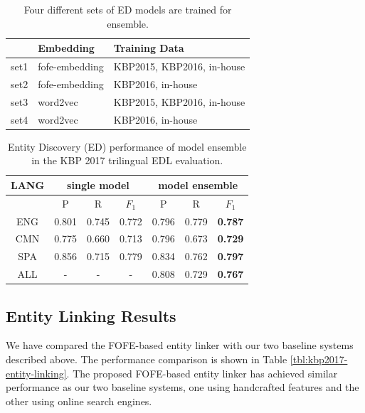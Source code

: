\documentclass[11pt]{article}
\begin{document}
\begin{table}
	\centering
	\begin{tabular}{|l|l|l|}
		\hline
		& Embedding & Training Data \\
		\hline
		set1 & fofe-embedding & KBP2015, KBP2016, in-house  \\
		set2 & fofe-embedding & KBP2016, in-house  \\
		set3 & word2vec & KBP2015, KBP2016, in-house  \\
		set4 & word2vec & KBP2016, in-house  \\
		\hline
	\end{tabular}
	\caption{Four different sets of ED models are trained for ensemble.}
	\label{tbl:model-diff}
\end{table}

\begin{table}
	\centering
	\begin{tabular}{|c|c|c|c|c|c|c|}
		\hline
		LANG  &  \multicolumn{3}{|c|}{single model} & \multicolumn{3}{|c|}{model ensemble} \\ \hline
		  &  P   &  R  &  $F_1$ &  P   &  R  &  $F_1$ \\ \hline 
		ENG &  0.801 & 0.745 & 0.772 & 0.796 & 0.779 & {\bf 0.787} \\
		CMN  &  0.775 & 0.660 & 0.713 & 0.796 & 0.673 & {\bf 0.729}  \\	
		SPA &  0.856 & 0.715 & 0.779 & 0.834 & 0.762 & {\bf 0.797}  \\ \hline
		ALL & -  & -  &  - & 0.808 & 0.729 & {\bf 0.767} \\
      \hline
	\end{tabular}
	\caption{Entity Discovery (ED) performance of model ensemble in the KBP 2017 trilingual EDL evaluation. }
	\label{tbl:kbp2017-EDL-modelensemble}	
\end{table}

\subsection{Entity Linking Results}

We have compared the FOFE-based entity linker with our two baseline systems described above. The performance comparison is shown in Table \ref{tbl:kbp2017-entity-linking}. The proposed FOFE-based entity linker has achieved similar performance as our two baseline systems, one using handcrafted features and the other using online search engines. 
\end{document}
